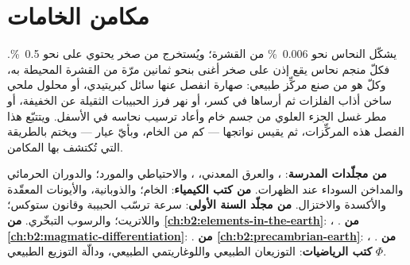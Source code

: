 \chapter{مكامن الخامات}\label{ch:b2:ore-deposits}

يشكّل النحاس نحو \qty{0.006}{\percent} من القشرة؛ ويُستخرج من صخر يحتوي على نحو
\qty{0.5}{\percent}. فكلّ منجم نحاس يقع إذن على صخر أغنى بنحو ثمانين مرّة من
القشرة المحيطة به، وكلّ  هو من صنع مركِّز طبيعي: صهارة
انفصل عنها سائل كبريتيدي، أو محلول ملحي ساخن أذاب الفلزات ثم أرساها في كسر، أو
نهر فرز الحبيبات الثقيلة عن الخفيفة، أو مطر غسل الجزء العلوي من جسم خام وأعاد
ترسيب نحاسه في الأسفل. ويتتبّع هذا الفصل هذه المركِّزات، ثم يقيس
نواتجها --- كم من الخام، وبأيّ عيار --- ويختم بالطريقة التي تُكتشف بها المكامن.

\begin{recall}
\textbf{من مجلّدات المدرسة}:  ، والعرق المعدني، ، والاحتياطي
والمورد؛ والدوران الحرمائي والمداخن السوداء عند الظهرات. \textbf{من كتب
الكيمياء}: الخام؛ والذوبانية، والأيونات المعقّدة والأكسدة والاختزال. \textbf{من مجلّد السنة الأولى}: سرعة
ترسّب الحبيبة وقانون ستوكس؛ واللاتريت؛ والرسوب التبخّري. \textbf{من
\cref{ch:b2:elements-in-the-earth}}: ، . \textbf{من \cref{ch:b2:magmatic-differentiation}}: 
. \textbf{من \cref{ch:b2:precambrian-earth}}: ، .
\textbf{من كتب الرياضيات}: التوزيعان الطبيعي واللوغاريتمي الطبيعي، ودالّة التوزيع
الطبيعي $\Phi$.
\end{recall}

